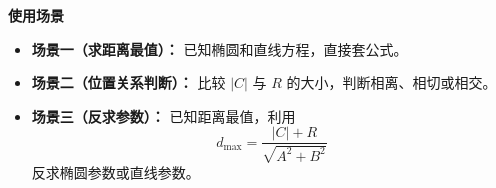 \begin{explanationbox}
	\medskip

	\textbf{\textcolor{CExplanation}{使用场景}}

	\begin{itemize}[leftmargin=*, itemsep=0.5em, topsep=0.4em]
		\item \textbf{场景一（求距离最值）：}
		      已知椭圆和直线方程，直接套公式。

		\item \textbf{场景二（位置关系判断）：}
		      比较 \(|C|\) 与 \(R\) 的大小，判断相离、相切或相交。

		\item \textbf{场景三（反求参数）：}
		      已知距离最值，利用
		      \[
			      d_{\max}=\frac{|C|+R}{\sqrt{A^2+B^2}}
		      \]
		      反求椭圆参数或直线参数。
	\end{itemize}

\end{explanationbox}